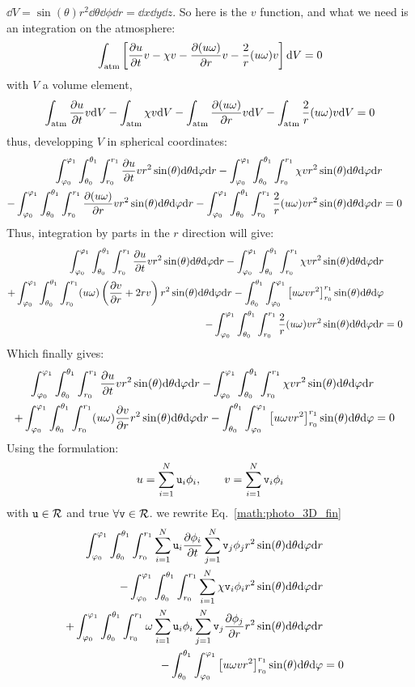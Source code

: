 $\dd V = \sin(\theta)r^2\dd\theta\dd\phi\dd r = \dd x \dd y \dd z$.
So here is the $v$ function, and what we need is an integration on
the atmosphere:
\begin{equation}
\intvol\left[\doverd{u}{t}v - \chi v - \doverd{(u\omega)}{r}v - \frac{2}{r}(u\omega)v\right] \dd V = 0
\end{equation}
with $V$ a volume element,
\begin{equation}
  \intvol\doverd{u}{t}v\dd V 
- \intvol\chi v \dd V 
- \intvol\doverd{(u\omega)}{r}v \dd V 
- \intvol\frac{2}{r}(u\omega)v \dd V = 0
\label{math:photo_3D_start}
\end{equation}
thus, developping $V$ in spherical coordinates:
\begin{equation}
\begin{split}
  \intr\doverd{u}{t}v\dVs
- \intr\chi v \dVs \\
- \intr\doverd{(u\omega)}{r}v \dVs
- \intr\frac{2}{r}(u\omega)v \dVs & = 0
\end{split}
\label{math:photo_3D_dev}
\end{equation}
Thus, integration by parts in the $r$ direction will give:
\begin{equation}
\begin{split}
  \intr\doverd{u}{t}v\dVs 
- \intr\chi v \dVs \\
+ \intr(u\omega)\left(\doverd{v}{r} + 2rv\right) \dVs
- \inttheta\intphy\left[u\omega v r^2\right]^{r_1}_{r_0}\sin(\theta)\dd\theta\dd\varphi \\
- \intr\frac{2}{r}(u\omega)v \dVs 
& = 0
\end{split}
\end{equation}
Which finally gives:
\begin{equation}
\begin{split}
  \intr\doverd{u}{t}v\dVs 
- \intr\chi v \dVs \\
+ \intr(u\omega)\doverd{v}{r}\dVs
- \inttheta\intphy\left[u\omega v r^2\right]^{r_1}_{r_0}\sin(\theta)\dd\theta\dd\varphi 
& = 0
\end{split}
\label{math:photo_3D_fin}
\end{equation}
Using the formulation:
\begin{equation}
u = \sum_{i=1}^N \ui_i \phi_i,\qquad v = \sum_{i=1}^N\vi_i \phi_i
\end{equation}
with $\ui \in \mathcal{R}$ and true $\forall \vi \in \mathcal{R}$. 
we rewrite Eq.~\ref{math:photo_3D_fin}
\begin{equation}
\begin{split}
  \intr\sum_{i=1}^N\ui_i\doverd{\phi_i}{t}\sum_{j=1}^N\vi_j \phi_j \dVs \\
- \intr\sum_{i=1}^N\chi\vi_i\phi_i \dVs \\
+ \intr\omega\sum_{i=1}^N\ui_i\phi_i\sum_{j=1}^N\vi_j\doverd{\phi_j}{r} \dVs \\
- \inttheta\intphy\left[u\omega v r^2\right]^{r_1}_{r_0}\sin(\theta)\dd\theta\dd\varphi & = 0
\end{split}
\end{equation}
